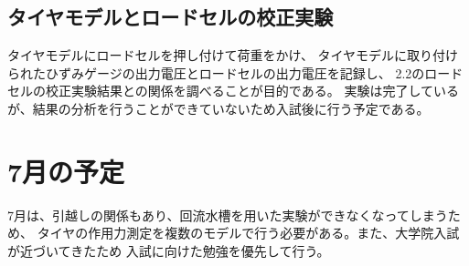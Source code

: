\documentclass[twocolumn,a4j]{jsarticle}
\begin{document}
\subsection{タイヤモデルとロードセルの校正実験}
タイヤモデルにロードセルを押し付けて荷重をかけ、
タイヤモデルに取り付けられたひずみゲージの出力電圧とロードセルの出力電圧を記録し、
2.2のロードセルの校正実験結果との関係を調べることが目的である。
実験は完了しているが、結果の分析を行うことができていないため入試後に行う予定である。

\section{7月の予定}
7月は、引越しの関係もあり、回流水槽を用いた実験ができなくなってしまうため、
タイヤの作用力測定を複数のモデルで行う必要がある。また、大学院入試が近づいてきたため
入試に向けた勉強を優先して行う。
\end{document}
